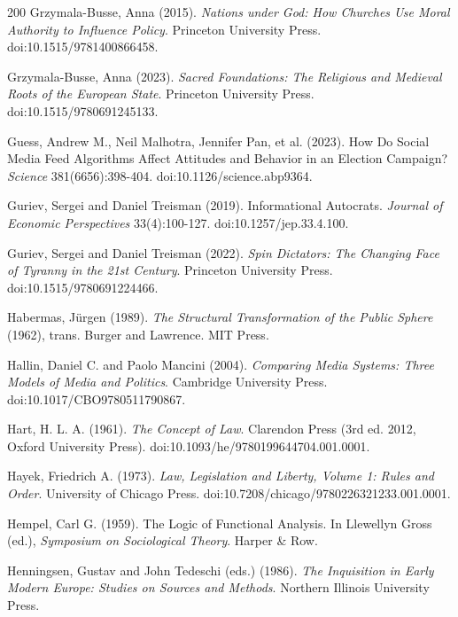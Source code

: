 \documentclass[11pt,letterpaper]{article}
\theoremstyle{definition}
\theoremstyle{remark}
\begin{document}
\begin{thebibliography}{200}
Grzymala-Busse, Anna (2015). \emph{Nations under God: How Churches Use Moral Authority to Influence Policy}. Princeton University Press. doi:10.1515/9781400866458.

Grzymala-Busse, Anna (2023). \emph{Sacred Foundations: The Religious and Medieval Roots of the European State}. Princeton University Press. doi:10.1515/9780691245133.

Guess, Andrew M., Neil Malhotra, Jennifer Pan, et al. (2023). How Do Social Media Feed Algorithms Affect Attitudes and Behavior in an Election Campaign? \emph{Science} 381(6656):398-404. doi:10.1126/science.abp9364.

Guriev, Sergei and Daniel Treisman (2019). Informational Autocrats. \emph{Journal of Economic Perspectives} 33(4):100-127. doi:10.1257/jep.33.4.100.

Guriev, Sergei and Daniel Treisman (2022). \emph{Spin Dictators: The Changing Face of Tyranny in the 21st Century}. Princeton University Press. doi:10.1515/9780691224466.

Habermas, J\"urgen (1989). \emph{The Structural Transformation of the Public Sphere} (1962), trans. Burger and Lawrence. MIT Press.

Hallin, Daniel C. and Paolo Mancini (2004). \emph{Comparing Media Systems: Three Models of Media and Politics}. Cambridge University Press. doi:10.1017/CBO9780511790867.

Hart, H. L. A. (1961). \emph{The Concept of Law}. Clarendon Press (3rd ed. 2012, Oxford University Press). doi:10.1093/he/9780199644704.001.0001.

Hayek, Friedrich A. (1973). \emph{Law, Legislation and Liberty, Volume 1: Rules and Order}. University of Chicago Press. doi:10.7208/chicago/9780226321233.001.0001.

Hempel, Carl G. (1959). The Logic of Functional Analysis. In Llewellyn Gross (ed.), \emph{Symposium on Sociological Theory}. Harper \& Row.

Henningsen, Gustav and John Tedeschi (eds.) (1986). \emph{The Inquisition in Early Modern Europe: Studies on Sources and Methods}. Northern Illinois University Press.


\end{thebibliography}
\end{document}
